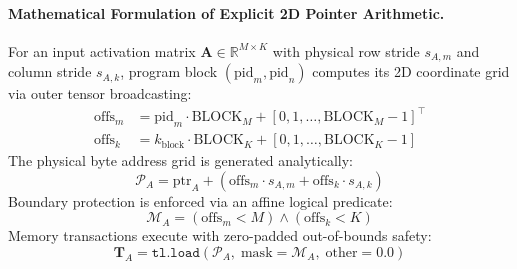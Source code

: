 \paragraph{Mathematical Formulation of Explicit 2D Pointer Arithmetic.}
For an input activation matrix $\mathbf{A} \in \mathbb{R}^{M \times K}$ with physical row stride $s_{A, m}$ and column stride $s_{A, k}$, program block $(\text{pid}_m, \text{pid}_n)$ computes its 2D coordinate grid via outer tensor broadcasting:
\begin{align}
\text{offs}_m &= \text{pid}_m \cdot \text{BLOCK}_M + [0, 1, \dots, \text{BLOCK}_M - 1]^\top \label{eq:offs_m_def} \\
\text{offs}_k &= k_{\text{block}} \cdot \text{BLOCK}_K + [0, 1, \dots, \text{BLOCK}_K - 1] \label{eq:offs_k_def}
\end{align}
The physical byte address grid is generated analytically:
\begin{equation}
\label{eq:pointer_grid_calc}
\mathcal{P}_A = \text{ptr}_A + \left(\text{offs}_m \cdot s_{A, m} + \text{offs}_k \cdot s_{A, k}\right)
\end{equation}
Boundary protection is enforced via an affine logical predicate:
\begin{equation}
\label{eq:affine_mask_calc}
\mathcal{M}_A = (\text{offs}_m < M) \land (\text{offs}_k < K)
\end{equation}
Memory transactions execute with zero-padded out-of-bounds safety:
\begin{equation}
\label{eq:masked_load_triton}
\mathbf{T}_A = \mathtt{tl.load}\left(\mathcal{P}_A, \; \text{mask}=\mathcal{M}_A, \; \text{other}=0.0\right)
\end{equation}


